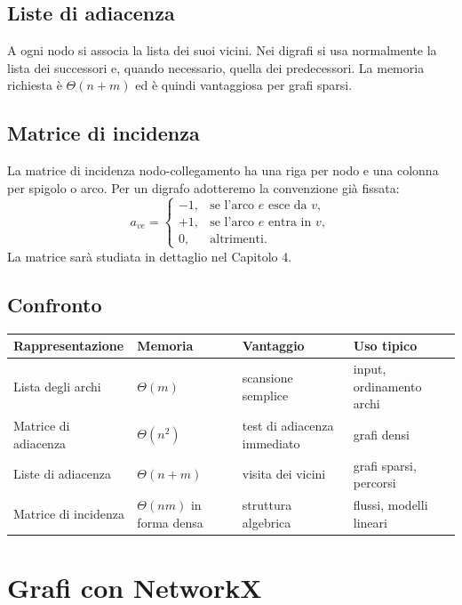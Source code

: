 \documentclass[11pt,a4paper]{article}
\begin{document}
\subsection{Liste di adiacenza}

A ogni nodo si associa la lista dei suoi vicini. Nei digrafi si usa normalmente la lista dei successori e, quando necessario, quella dei predecessori. La memoria richiesta è $\Theta(n+m)$ ed è quindi vantaggiosa per grafi sparsi.

\subsection{Matrice di incidenza}

La matrice di incidenza nodo-collegamento ha una riga per nodo e una colonna per spigolo o arco. Per un digrafo adotteremo la convenzione già fissata:
\[
a_{ve}=\begin{cases}
-1,&\text{se l'arco $e$ esce da $v$},\\
+1,&\text{se l'arco $e$ entra in $v$},\\
0,&\text{altrimenti.}
\end{cases}
\]
La matrice sarà studiata in dettaglio nel Capitolo 4.

\subsection{Confronto}

\begin{center}
\begin{tabular}{p{3.4cm}p{3.2cm}p{3.2cm}p{3.2cm}}
\toprule
Rappresentazione & Memoria & Vantaggio & Uso tipico\\
\midrule
Lista degli archi & $\Theta(m)$ & scansione semplice & input, ordinamento archi\\
Matrice di adiacenza & $\Theta(n^2)$ & test di adiacenza immediato & grafi densi\\
Liste di adiacenza & $\Theta(n+m)$ & visita dei vicini & grafi sparsi, percorsi\\
Matrice di incidenza & $\Theta(nm)$ in forma densa & struttura algebrica & flussi, modelli lineari\\
\bottomrule
\end{tabular}
\end{center}

\section{Grafi con NetworkX}
\end{document}
